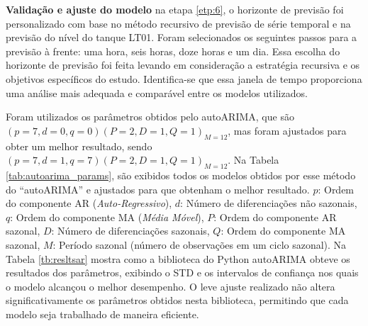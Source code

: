 \textbf{Validação e ajuste do modelo}
na etapa \ref{etp:6}, o horizonte de previsão foi personalizado com base no método recursivo de previsão de série temporal e na previsão do nível do tanque LT01. Foram selecionados os seguintes passos para a previsão à frente: uma hora, seis horas, doze horas e um dia. Essa escolha do horizonte de previsão foi feita levando em consideração a estratégia recursiva e os objetivos específicos do estudo. Identifica-se que essa janela de tempo proporciona uma análise mais adequada e comparável entre os modelos utilizados.

Foram utilizados os parâmetros obtidos pelo autoARIMA, que são $(p = 7, d = 0, q = 0) (P = 2, D = 1, Q = 1)_{M = 12}$, mas foram ajustados para obter um melhor resultado, sendo $(p = 7, d = 1, q = 7) (P = 2, D = 1, Q = 1)_{M = 12}$. Na Tabela \ref{tab:autoarima_params}, são exibidos todos os modelos obtidos por esse método do ``autoARIMA'' e ajustados para que obtenham o melhor resultado.
\(p\): Ordem do componente AR (\textit{Auto-Regressivo}),
\(d\): Número de diferenciações não sazonais,
\(q\): Ordem do componente MA (\textit{Média Móvel}),
\(P\): Ordem do componente AR sazonal,
\(D\): Número de diferenciações sazonais,
\(Q\): Ordem do componente MA sazonal,
\(M\): Período sazonal (número de observações em um ciclo sazonal).
Na Tabela \ref{tb:resltsar} mostra como a biblioteca do Python autoARIMA obteve os resultados dos parâmetros, exibindo o STD e os intervalos de confiança nos quais o modelo alcançou o melhor desempenho. O leve ajuste realizado não altera significativamente os parâmetros obtidos nesta biblioteca, permitindo que cada modelo seja trabalhado de maneira eficiente.

